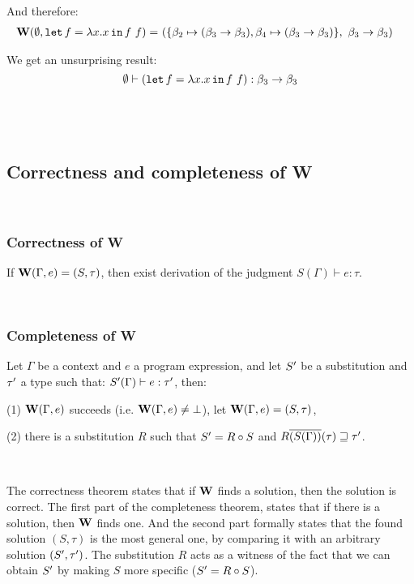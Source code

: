 \documentclass[a4paper,oneside]{memoir}
\begin{document}
And therefore:
\begin{align*}
\operatorname{\textbf{W}}(\emptyset, \texttt{let} \, f = \lambda x . x \, \texttt{in} \, f~f) = ~ & (\{ \beta_2 \mapsto (\beta_3 \rightarrow \beta_3), \beta_4 \mapsto (\beta_3 \rightarrow \beta_3) \},~ \beta_3 \rightarrow \beta_3)
\end{align*}

We get an unsurprising result:
$$\emptyset \vdash (\texttt{let} \, f = \lambda x . x \, \texttt{in} \, f~f) : \beta_3 \rightarrow \beta_3$$
~

~






\subsection{Correctness and completeness of W}

~

\subsubsection{Correctness of W}

If $\operatorname{\textbf{W}}(\Gamma, e) = (S, \tau)$, then exist derivation of the judgment $S(\Gamma) \vdash e : \tau$.

~

\subsubsection{Completeness of W}

Let $\Gamma$ be a context and $e$ a program expression,
and let $S^\prime$ be a substitution and $\tau^\prime$ a type such that:
$ S^\prime(\Gamma) \vdash e : \tau^\prime $, 
then:

(1) $\operatorname{\textbf{W}}(\Gamma,e)$ succeeds (i.e. $\operatorname{\textbf{W}}(\Gamma,e) \neq \bot$), 
let $\operatorname{\textbf{W}}(\Gamma,e) = (S, \tau)$,

(2) there is a substitution $R$ such that $S^\prime = R \circ S$ 
and $R\overline{(S(\Gamma))}(\tau) \sqsupseteq \tau^\prime$. 

~ 

The correctness theorem states that if $\operatorname{\textbf{W}}$ finds a solution, then the solution is correct.
The first part of the completeness theorem, states that if there is a solution, then $\operatorname{\textbf{W}}$ finds one. And the second part formally states that the found solution $(S,\tau)$ is the most general one, by comparing it with an arbitrary solution $(S^\prime,\tau^\prime)$. The substitution $R$ acts as a witness of the fact that we can obtain $S^\prime$ by making $S$ more specific ($S^\prime = R \circ S$).  
\end{document}
